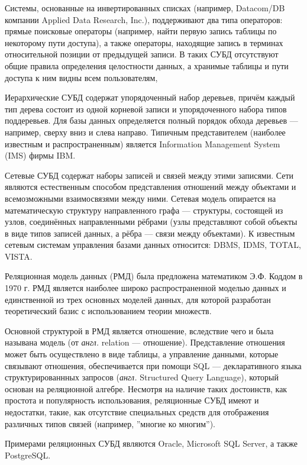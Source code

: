 Системы, основанные на инвертированных списках (например, Datacom/DB компании Applied Data Research, Inc.), поддерживают два типа операторов: прямые поисковые операторы (например, найти первую запись таблицы по некоторому пути доступа), а также операторы, находящие запись в терминах относительной позиции от предыдущей записи.
В таких СУБД отсутствуют общие правила определения целостности данных, а хранимые таблицы и пути доступа к ним видны всем пользователям,

Иерархические СУБД содержат упорядоченный набор деревьев, причём каждый тип дерева состоит из одной корневой записи и упорядоченного набора типов поддеревьев.
Для базы данных определяется полный порядок обхода деревьев --- например, сверху вниз и слева направо. 
Типичным представителем (наиболее известным и распространенным) является Information Management System (IMS) фирмы IBM.

Сетевые СУБД содержат наборы записей и связей между этими записями. 
Сети являются естественным способом представления отношений между объектами и всемозможными взаимосвязями между ними.
Сетевая модель опирается на математическую структуру направленного графа --- структуры, состоящей из узлов, соединённых направленными рёбрами (узлы представляют собой объекты в виде типов записей данных, а рёбра --- связи между объектами).
К известным сетевым системам управления базами данных относится: DBMS, IDMS, TOTAL, VISTA.

Реляционная модель данных (РМД) была предложена математиком Э.Ф. Коддом в 1970 г. 
РМД является наиболее широко распространенной моделью данных и единственной из трех основных моделей данных, для которой разработан теоретический базис с использованием теории множеств.

Основной структурой в РМД является отношение, вследствие чего и была называна модель (от \textit{англ.} relation --- отношение). 
Представление отношения может быть осуществлено в виде таблицы, а управление данными, которые связывают отношения, обеспечивается при помощи SQL --- декларативного языка структурированнных запросов (\textit{англ.} Structured Query Language), который основан на реляционной алгебре. 
Несмотря на наличие таких достоинств, как простота и популярность использования, реляционные СУБД имеют и недостатки, такие, как отсутствие специальных средств для отображения различных типов связей (например, ''многие ко многим'').

Примерами реляционных СУБД являются Oracle, Microsoft SQL Server, а также PostgreSQL.

